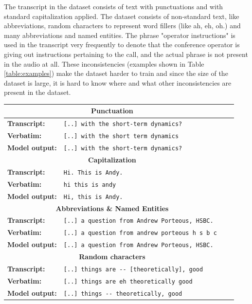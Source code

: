 The transcript in the dataset consists of text with punctuations and with standard capitalization applied. The dataset consists of non-standard text, like abbreviations, random characters to represent word fillers (like ah, eh, oh.) and many abbreviations and named entities. The phrase "operator instructions" is used in the transcript very frequently to denote that the conference operator is giving out instructions pertaining to the call, and the actual phrase is not present in the audio at all. These inconsistencies (examples shown in Table \ref{table:examples}) make the dataset harder to train and since the size of the dataset is large, it is hard to know where and what other inconsistencies are present in the dataset. 


\begin{table}[ht]
\begin{tabular}{ l p{9.6cm} c c }

 \hline
 \multicolumn{2}{c}{\textbf{Punctuation}} \\
 \hline
 \textbf{Transcript:} & \verb|[..] with the short-term dynamics?| \\ 
 \textbf{Verbatim:} & \verb|[..] with the short term dynamics| \\
 \textbf{Model output:} & \verb|[..] with the short-term dynamics?| \\
 \hline\hline

 \multicolumn{2}{c}{\textbf{Capitalization}} \\
 \hline
 \textbf{Transcript:} & \verb|Hi. This is Andy.| \\ 
 \textbf{Verbatim:} & \verb|hi this is andy| \\
 \textbf{Model output:} & \verb|Hi, this is Andy.| \\
 \hline\hline
 
 \multicolumn{2}{c}{\textbf{Abbreviations \& Named Entities}} \\
 \hline
 \textbf{Transcript:} & \verb|[..] a question from Andrew Porteous, HSBC.| \\ 
 \textbf{Verbatim:} & \verb|[..] a question from andrew porteous h s b c| \\
 \textbf{Model output:} & \verb|[..] a question from Andrew Porteous, HSBC.| \\
 \hline\hline
 
 \multicolumn{2}{c}{\textbf{Random characters}} \\
 \hline
 \textbf{Transcript:} & \verb|[..] things are -- [theoretically], good| \\ 
 \textbf{Verbatim:} & \verb|[..] things are eh theoretically good| \\
 \textbf{Model output:} & \verb|[..] things -- theoretically, good| \\
 \hline\hline
 

\end{tabular}
\end{table}
